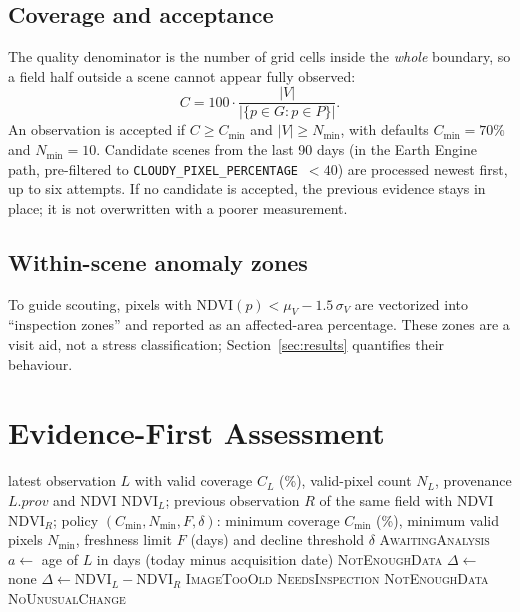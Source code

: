\documentclass[conference]{IEEEtran}
\newcommand{\NDVI}{\mathrm{NDVI}}
\begin{document}
\subsection{Coverage and acceptance}
The quality denominator is the number of grid cells inside the \emph{whole} boundary, so a field half outside a scene cannot appear fully observed:
\begin{equation}
C = 100\cdot\frac{|V|}{|\{p\in G : p\in P\}|}.
\end{equation}
An observation is accepted if $C \ge C_{\min}$ and $|V|\ge N_{\min}$, with defaults $C_{\min}=70\%$ and $N_{\min}=10$. Candidate scenes from the last 90 days (in the Earth Engine path, pre-filtered to \texttt{CLOUDY\_PIXEL\_PERCENTAGE}~$<40$) are processed newest first, up to six attempts. If no candidate is accepted, the previous evidence stays in place; it is not overwritten with a poorer measurement.

\subsection{Within-scene anomaly zones}
To guide scouting, pixels with $\NDVI(p) < \mu_V - 1.5\,\sigma_V$ are vectorized into ``inspection zones'' and reported as an affected-area percentage. These zones are a visit aid, not a stress classification; Section~\ref{sec:results} quantifies their behaviour.

\section{Evidence-First Assessment}\label{sec:evidence}
\begin{algorithm}[t]
\caption{Field assessment from accepted evidence}
\label{alg:assess}
\begin{algorithmic}[1]
\Require latest observation $L$ with valid coverage $C_L$ (\%), valid-pixel count $N_L$, provenance $L.\mathit{prov}$ and NDVI $\NDVI_L$; previous observation $R$ of the same field with NDVI $\NDVI_R$; policy $(C_{\min},N_{\min},F,\delta)$: minimum coverage $C_{\min}$ (\%), minimum valid pixels $N_{\min}$, freshness limit $F$ (days) and decline threshold $\delta$
 \Return \textsc{AwaitingAnalysis} \EndIf
\State $a \gets$ age of $L$ in days (today minus acquisition date)
  \State \Return \textsc{NotEnoughData}
\EndIf
\State $\Delta \gets$ none
  \State $\Delta \gets \NDVI_L - \NDVI_R$
\EndIf
{} \Return \textsc{ImageTooOld} \EndIf
{} \Return \textsc{NeedsInspection} \EndIf
{} \Return \textsc{NotEnoughData} \EndIf
\State \Return \textsc{NoUnusualChange}
\end{algorithmic}
\end{algorithm}
\end{document}

